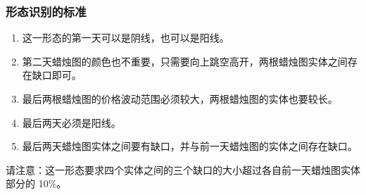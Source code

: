\subsubsection*{形态识别的标准}
\begin{enumerate}
    \item 这一形态的第一天可以是阴线，也可以是阳线。
    \item 第二天蜡烛图的颜色也不重要，只需要向上跳空高开，两根蜡烛图实体之间存在缺口即可。
    \item 最后两根蜡烛图的价格波动范围必须较大，两根蜡烛图的实体也要较长。
    \item 最后两天必须是阳线。
    \item 最后两天蜡烛图实体之间要有缺口，并与前一天蜡烛图的实体之间存在缺口。
\end{enumerate}

请注意：这一形态要求四个实体之间的三个缺口的大小超过各自前一天蜡烛图实体部分的 10\%。